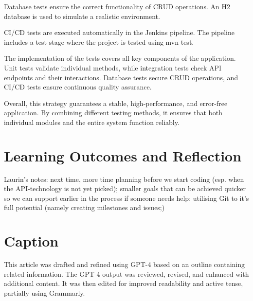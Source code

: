 \documentclass[a4paper, 11pt]{article}
\begin{document}
Database tests ensure the correct functionality of CRUD operations. An H2 database is used to simulate a realistic environment.

CI/CD tests are executed automatically in the Jenkins pipeline. The pipeline includes a test stage where the project is tested using mvn test.

The implementation of the tests covers all key components of the application. Unit tests validate individual methods, while integration tests check API endpoints and their interactions. Database tests secure CRUD operations, and CI/CD tests ensure continuous quality assurance.

Overall, this strategy guarantees a stable, high-performance, and error-free application. By combining different testing methods, it ensures that both individual modules and the entire system function reliably.


    \section{Learning Outcomes and Reflection}\label{sec:learning-outcomes-and-reflection}
    Laurin's notes: next time, more time planning before we start coding (esp. when the API-technology is not yet picked); smaller goals that can be achieved quicker so we can support earlier in the process if someone needs help; utilising Git to it's full potential (namely creating milestones and issues;)



    \section*{Caption}
    This article was drafted and refined using GPT-4 based on an outline containing related information. The GPT-4 output was reviewed, revised, and enhanced with additional content. It was then edited for improved readability and active tense, partially using Grammarly.
\end{document}
